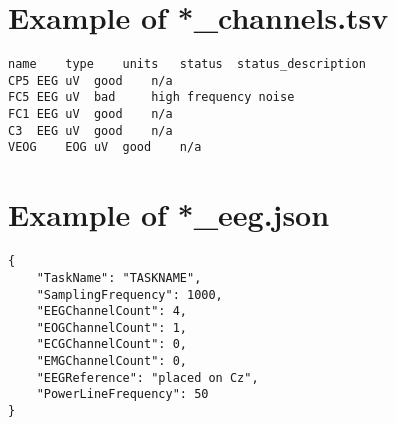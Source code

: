 \documentclass[a4paper,10pt]{article}
\begin{document}
\thispagestyle{empty}

\begin{large}

\section*{Example of *\_channels.tsv}
\begin{lstlisting}[basicstyle=\bf]
name	type	units	status	status_description
CP5	EEG	uV	good	n/a
FC5	EEG	uV	bad     high frequency noise
FC1	EEG	uV	good	n/a
C3	EEG	uV	good	n/a
VEOG	EOG	uV	good	n/a

\end{lstlisting}

\vskip 1cm

\section*{Example of *\_eeg.json}

\begin{lstlisting}[basicstyle=\bf]
{
    "TaskName": "TASKNAME",
    "SamplingFrequency": 1000,
    "EEGChannelCount": 4,
    "EOGChannelCount": 1,
    "ECGChannelCount": 0,
    "EMGChannelCount": 0,
    "EEGReference": "placed on Cz",
    "PowerLineFrequency": 50
}

\end{lstlisting}
\end{large}
\end{document}
